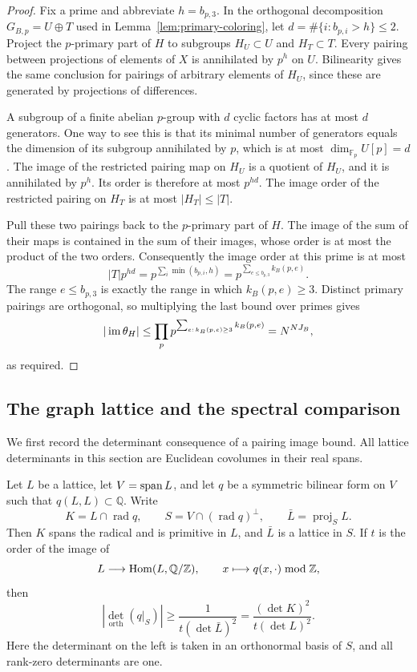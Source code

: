 \begin{proof}
Fix a prime and abbreviate \(h=b_{p,3}\). In the orthogonal
decomposition \(G_{B,p}=U\oplus T\) used in
Lemma~\ref{lem:primary-coloring}, let
\(d=\#\{i:b_{p,i}>h\}\le2\). Project the \(p\)-primary part of \(H\)
to subgroups \(H_U\subset U\) and \(H_T\subset T\).
Every pairing between projections of elements of \(X\) is
annihilated by \(p^h\) on \(U\). Bilinearity gives the same
conclusion for pairings of arbitrary elements of \(H_U\), since
these are generated by projections of differences.

A subgroup of a finite abelian \(p\)-group with \(d\) cyclic factors
has at most \(d\) generators. One way to see this is that its
minimal number of generators equals the dimension of its subgroup
annihilated by \(p\), which is at most
\(\dim_{\mathbb F_p}U[p]=d\). The image of the restricted pairing
map on \(H_U\) is a quotient of \(H_U\), and it is annihilated by
\(p^h\). Its order is therefore at most \(p^{hd}\). The image
order of the restricted pairing on \(H_T\) is at most
\(|H_T|\le|T|\).

Pull these two pairings back to the \(p\)-primary part of \(H\).
The image of the sum of their maps is contained in the sum of
their images, whose order is at most the product of the two
orders. Consequently the image order at this prime is at most
\[
 |T|p^{hd}
 =p^{\sum_i\min(b_{p,i},h)}
 =p^{\sum_{e\le b_{p,3}}k_B(p,e)}.
\]
The range \(e\le b_{p,3}\) is exactly the range in which
\(k_B(p,e)\ge3\). Distinct primary pairings are orthogonal, so
multiplying the last bound over primes gives
\[
 |\operatorname{im}\theta_H|
 \le\prod_p p^{\sum_{e:\,k_B(p,e)\ge3}k_B(p,e)}
 =N^{NJ_B},
\]
as required.
\end{proof}

\subsection{The graph lattice and the spectral comparison}

We first record the determinant consequence of a pairing image
bound. All lattice determinants in this section are Euclidean
covolumes in their real spans.

\begin{lemma}\label{lem:pairing-determinant}
Let \(L\) be a lattice, let \(V=\operatorname{span} L\), and let \(q\) be a
symmetric bilinear form on \(V\) such that \(q(L,L)\subset\mathbb Q\).
Write
\[
 K=L\cap\operatorname{rad}q,\qquad
 S=V\cap(\operatorname{rad}q)^\perp,\qquad
 \bar L=\operatorname{proj}_S L.
\]
Then \(K\) spans the radical and is primitive in \(L\), and
\(\bar L\) is a lattice in \(S\). If \(t\) is the order of the
image of
\[
 L\longrightarrow\operatorname{Hom}(L,\mathbb Q/\mathbb Z),\qquad
 x\longmapsto q(x,\cdot)\bmod\mathbb Z,
\]
then
\begin{equation}\label{eq:pairing-determinant}
 \left|\det_{\mathrm{orth}}(q|_S)\right|
 \ge \frac{1}{t(\det\bar L)^2}
 =\frac{(\det K)^2}{t(\det L)^2}.
\end{equation}
Here the determinant on the left is taken in an orthonormal basis
of \(S\), and all rank-zero determinants are one.
\end{lemma}

